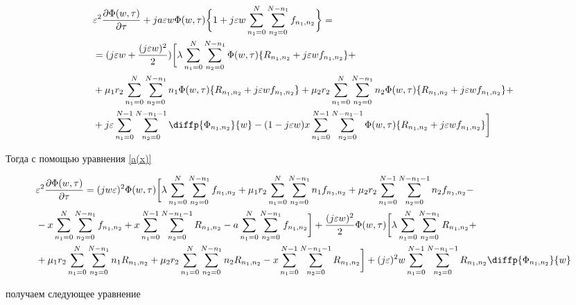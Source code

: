 \begin{equation*}
	\begin{split}
		&\varepsilon^2 \frac{\partial \Phi (w,\tau)}{\partial \tau}+ja\varepsilon w \Phi (w,\tau)\bigg\{1+j\varepsilon w\sum_{n_1=0}^N\sum_{n_2=0}^{N-n_1}f_{n_{1}, n_{2}}\bigg\}=\\
		&=(j\varepsilon w +\frac{(j\varepsilon w)^2}{2})\bigg[\lambda \sum_{n_1=0}^N\sum_{n_2=0}^{N-n_1}\Phi (w,\tau)\{R_{n_{1}, n_{2}}+j\varepsilon wf_{n_{1}, n_{2}}\}+\\
		&+\mu_{1} r_{2}\sum_{n_1=0}^{N}\sum_{n_2=0}^{N-n_1}n_{1}\Phi (w,\tau)\{R_{n_{1}, n_{2}}+j\varepsilon wf_{n_{1}, n_{2}}\}+\mu_{2} r_{2}\sum_{n_1=0}^{N}\sum_{n_2=0}^{N-n_1}n_{2}\Phi (w,\tau)\{R_{n_{1}, n_{2}}+j\varepsilon wf_{n_{1}, n_{2}}\}+\\
		&+j\varepsilon\sum_{n_1=0}^{N-1}\sum_{n_2=0}^{N-n_1-1}\diffp{\Phi_{n_{1}, n_{2}}}{w}-(1-j\varepsilon w)x\sum_{n_1=0}^{N-1}\sum_{n_2=0}^{N-n_1-1}\Phi (w,\tau)\{R_{n_{1}, n_{2}}+j\varepsilon wf_{n_{1}, n_{2}}\}\bigg]
	\end{split}
\end{equation*}

Тогда с помощью уравнения \eqref{a(x)}

\begin{equation*}
	\begin{split}
		&\varepsilon^2 \frac{\partial \Phi (w,\tau)}{\partial \tau}=(jw\varepsilon)^2\Phi (w,\tau)\bigg[\lambda\sum_{n_1=0}^N\sum_{n_2=0}^{N-n_1}f_{n_{1}, n_{2}}+\mu_{1}r_{2}\sum_{n_1=0}^{N}\sum_{n_2=0}^{N-n_1}n_{1}f_{n_{1}, n_{2}}+\mu_{2} r_{2}\sum_{n_1=0}^{N-1}\sum_{n_2=0}^{N-n_1-1}n_{2}f_{n_{1}, n_{2}}-\\
		&-x\sum_{n_1=0}^{N}\sum_{n_2=0}^{N-n_1}f_{n_{1}, n_{2}}+x\sum_{n_1=0}^{N-1}\sum_{n_2=0}^{N-n_1-1}R_{n_{1}, n_{2}}-a\sum_{n_1=0}^N\sum_{n_2=0}^{N-n_1}f_{n_{1}, n_{2}}\bigg] +\frac{(j\varepsilon w)^2}{2}\Phi (w,\tau)\bigg[\lambda\sum_{n_1=0}^N\sum_{n_2=0}^{N-n_1}R_{n_{1}, n_{2}}+\\
		&+\mu_{1}r_{2}\sum_{n_1=0}^{N}\sum_{n_2=0}^{N-n_1}n_{1}R_{n_{1}, n_{2}}+\mu_{2} r_{2}\sum_{n_1=0}^{N}\sum_{n_2=0}^{N-n_1}n_{2}R_{n_{1}, n_{2}}-x\sum_{n_1=0}^{N-1}\sum_{n_2=0}^{N-n_1-1}R_{n_{1}, n_{2}}\bigg]+(j\varepsilon)^2 w\sum_{n_1=0}^{N-1}\sum_{n_2=0}^{N-n_1-1}R_{n_{1}, n_{2}}\diffp{\Phi_{n_{1}, n_{2}}}{w}
	\end{split}
\end{equation*}

получаем следующее уравнение

